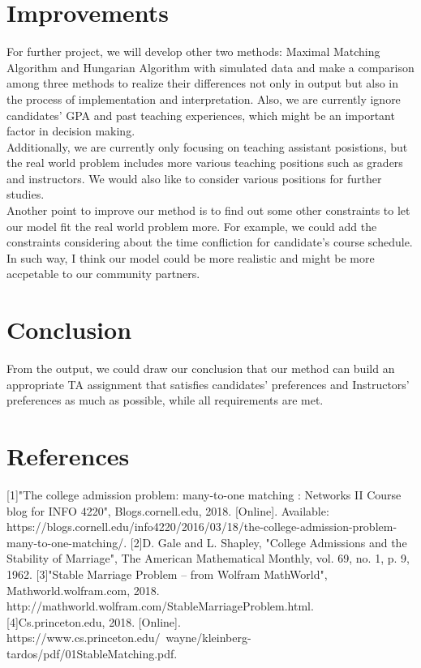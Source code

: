 \documentclass[twoside,twocolumn]{article}
\begin{document}
    \section{Improvements}
    For further project, we will develop other two methods: Maximal Matching Algorithm and Hungarian Algorithm with simulated data and make a 
    comparison among three methods to realize their differences not only in output but also in the process of implementation and 
    interpretation. Also, we are currently ignore candidates' GPA and past teaching experiences, which might be an important factor in decision 
    making. 
    \\ Additionally, we are currently only focusing on teaching assistant posistions, but the real world problem includes more various teaching
    positions such as graders and instructors. We would also like to consider various positions for further studies.
    \\ Another point to improve our method is to find out some other constraints to let our model fit the real world problem more. For example,
    we could add the constraints considering about the time confliction for candidate's course schedule. 
    \\ In such way, I think our model could be more realistic and might be more accpetable to our community partners.
    \section{Conclusion}
    From the output, we could draw our conclusion that our method can build an appropriate TA assignment that satisfies candidates' preferences
    and Instructors' preferences as much as possible, while all requirements are met.
    \section{References}
    [1]"The college admission problem: many-to-one matching : Networks II Course blog for INFO 4220", Blogs.cornell.edu, 2018. [Online]. 
    Available: https://blogs.cornell.edu/info4220/2016/03/18/the-college-admission-problem-many-to-one-matching/.
    [2]D. Gale and L. Shapley, "College Admissions and the Stability of Marriage", The American Mathematical Monthly, vol. 69, no. 1, p. 9, 1962.
    [3]"Stable Marriage Problem -- from Wolfram MathWorld", Mathworld.wolfram.com, 2018. http://mathworld.wolfram.com/StableMarriageProblem.html.
    [4]Cs.princeton.edu, 2018. [Online]. https://www.cs.princeton.edu/~wayne/kleinberg-tardos/pdf/01StableMatching.pdf. 
    
\end{document}
